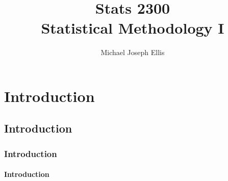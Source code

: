 \documentclass[11pt]{report}
\title{\Huge{Stats 2300}\\Statistical Methodology I}
\author{\huge{Michael Joseph Ellis}}
\date{}
\begin{document}
\maketitle
\newpage
\tableofcontents
\pagebreak

\chapter{Introduction}

\section{Introduction}

\subsection{Introduction}

\subsubsection{Introduction}
\end{document}
